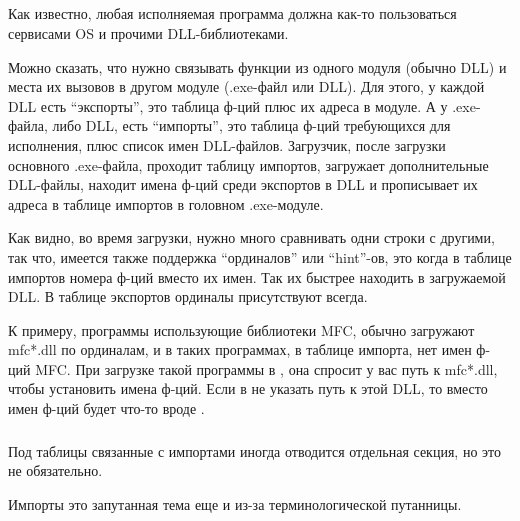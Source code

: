 \subsection{}

Как известно, любая исполняемая программа должна как-то пользоваться сервисами \ac{OS} и прочими DLL-библиотеками.

Можно сказать, что нужно связывать функции из одного модуля (обычно DLL) и места их вызовов в 
другом модуле (.exe-файл или DLL). 
Для этого, у каждой DLL есть ``экспорты'', это таблица ф-ций плюс их адреса в модуле.
А у .exe-файла, либо DLL, есть ``импорты'', это таблица ф-ций требующихся для исполнения, плюс список имен DLL-файлов.
Загрузчик, после загрузки основного .exe-файла, проходит таблицу импортов, загружает дополнительные DLL-файлы, 
находит имена ф-ций среди экспортов в DLL и прописывает их адреса в таблице импортов в головном .exe-модуле.

Как видно, во время загрузки, нужно много сравнивать одни строки с другими, так что, 
имеется также поддержка ``ординалов'' или 
``hint''-ов, это когда в таблице импортов номера ф-ций вместо их имен. Так их быстрее находить в загружаемой DLL.
В таблице экспортов ординалы присутствуют всегда.

К примеру, программы использующие библиотеки \ac{MFC}, обычно загружают mfc*.dll по ординалам, и в таких программах,
в таблице импорта, нет имен ф-ций \ac{MFC}. При загрузке такой программы в \IDA, она спросит у вас путь к mfc*.dll,
чтобы установить имена ф-ций. Если в \IDA не указать путь к этой DLL, то вместо имен ф-ций будет что-то вроде 
.

\subsubsection{}

Под таблицы связанные с импортами иногда отводится отдельная секция, но это не обязательно.

Импорты это запутанная тема еще и из-за терминологической путанницы.


